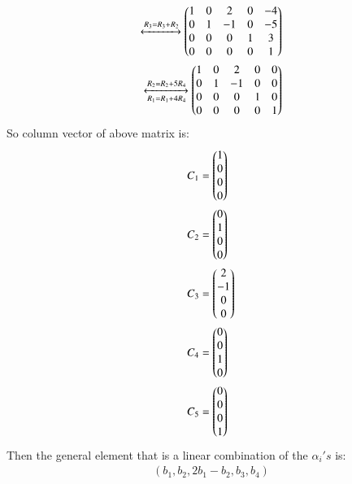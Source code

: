 \documentclass[journal,12pt,twocolumn]{IEEEtran}
\begin{document}
\begin{align}
            \xleftrightarrow{R_3 = R_3+R_2}
            \begin{pmatrix}1 & 0 & 2 & 0 & -4 \\
            0 & 1 & -1 & 0 & -5 \\
            0 & 0 & 0 & 1 & 3 \\
            0 & 0 & 0 & 0 & 1\end{pmatrix}\\
            \xleftrightarrow[R_1 = R_1+4R_4]{R_2=R_2+5R_4}
            \begin{pmatrix}1 & 0 & 2 & 0 & 0 \\
            0 & 1 & -1 & 0 & 0 \\
            0 & 0 & 0 & 1 & 0 \\
            0 & 0 & 0 & 0 & 1\end{pmatrix}
\end{align} 
So column vector of above matrix is:
\begin{align}
    C_1 &= \begin{pmatrix}1\\0\\0\\0\end{pmatrix}\\
    C_2 &= \begin{pmatrix}0\\1\\0\\0\end{pmatrix}\\
    C_3 &= \begin{pmatrix}2\\-1\\0\\0\end{pmatrix}\\
    C_4 &= \begin{pmatrix}0\\0\\1\\0\end{pmatrix}\\
    C_5 &= \begin{pmatrix}0\\0\\0\\1\end{pmatrix}
\end{align}
Then the general element that is a linear combination of the $\alpha_i's$ is:
\begin{align}
    (b_1,b_2,2b_1-b_2,b_3,b_4)
\end{align}
\end{document}
